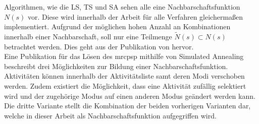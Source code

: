 Algorithmen, wie die \ac{LS}, \ac{TS} und \ac{SA} sehen alle eine Nachbarschaftsfunktion $N(s)$ vor. Diese wird innerhalb der Arbeit für alle Verfahren gleichermaßen implementiert. Aufgrund der möglichen hohen Anzahl an Kombinationen innerhalb einer Nachbarschaft, soll nur eine Teilmenge $\tilde{N}(s) \subset N(s)$ betrachtet werden. Dies geht aus der Publikation von \cite[S. 5]{thomas_tabu_1998} hervor. \\

Eine Publikation für das Lösen des \ac{mrcpsp} mithilfe von Simulated Annealing beschreibt drei Möglichkeiten zur Bildung einer Nachbarschaftsfunktion. Aktivitäten können innerhalb der Aktivitätsliste samt deren Modi verschoben werden. Zudem existiert die Möglichkeit, dass eine Aktivität zufällig selektiert wird und der zugehörige Modus auf einen anderen Modus geändert werden kann. Die dritte Variante stellt die Kombination der beiden vorherigen Varianten dar, welche in dieser Arbeit als Nachbarschaftsfunktion aufgegriffen wird. \cite[vgl.][S. 145]{jozefowska_simulated_2001}